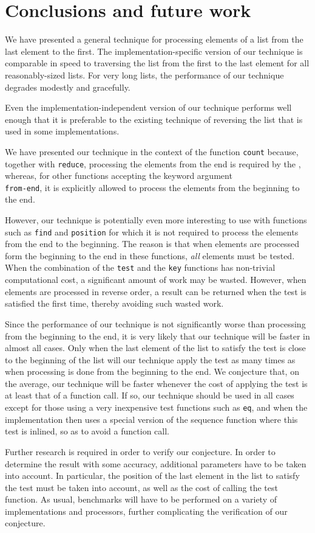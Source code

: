 \section{Conclusions and future work}

We have presented a general technique for processing elements of a
list from the last element to the first.  The implementation-specific
version of our technique is comparable in speed to traversing the list
from the first to the last element for all reasonably-sized lists.
For very long lists, the performance of our technique degrades
modestly and gracefully.

Even the implementation-independent version of our technique performs
well enough that it is preferable to the existing technique of
reversing the list that is used in some implementations.

We have presented our technique in the context of the function
\texttt{count} because, together with \texttt{reduce}, processing the
elements from the end is required by the \hs{}, whereas, for other
func\-tions accep\-ting the key\-word ar\-gument \\
\texttt{from-end},
it is ex\-plicitly al\-lowed to process the elements from the begin\-ning to the
end.

However, our technique is potentially even more interesting to use
with functions such as \texttt{find} and \texttt{position} for which
it is not required to process the elements from the end to the
beginning.  The reason is that when elements are processed form the
beginning to the end in these functions, \emph{all} elements must be
tested.  When the combination of the \texttt{test} and the
\texttt{key} functions has non-trivial computational cost, a
significant amount of work may be wasted.  However, when elements are
processed in reverse order, a result can be returned when the test is
satisfied the first time, thereby avoiding such wasted work.

Since the performance of our technique is not significant\-ly wor\-se than
processing from the beginning to the end, it is very likely that our
technique will be faster in almost all cases.  Only when the last
element of the list to satisfy the test is close to the beginning of
the list will our technique apply the test as many times as when
processing is done from the beginning to the end.  We conjecture that,
on the average, our technique will be faster whenever the cost of
applying the test is at least that of a function call.  If so, our
technique should be used in all cases except for those using a very
inexpensive test functions such as \texttt{eq}, and when the
implementation then uses a special version of the sequence function
where this test is inlined, so as to avoid a function call.

Further research is required in order to verify our conjecture.  In
order to determine the result with some accuracy, additional
parameters have to be taken into account.  In particular, the position
of the last element in the list to satisfy the test must be taken into
account, as well as the cost of calling the test function.  As usual,
benchmarks will have to be performed on a variety of implementations
and processors, further complicating the verification of our
conjecture.
